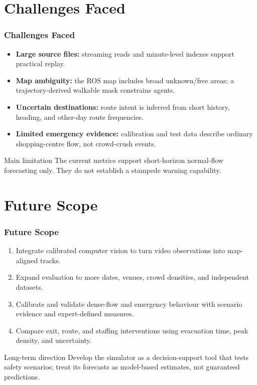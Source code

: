 \documentclass[aspectratio=43]{beamer}
\begin{document}
\section{Challenges Faced}
\begin{frame}\frametitle{Challenges Faced}
\begin{itemize}
\item \textbf{Large source files:} streaming reads and minute-level indexes support practical replay.
\item \textbf{Map ambiguity:} the ROS map includes broad unknown/free areas; a trajectory-derived walkable mask constrains agents.
\item \textbf{Uncertain destinations:} route intent is inferred from short history, heading, and other-day route frequencies.
\item \textbf{Limited emergency evidence:} calibration and test data describe ordinary shopping-centre flow, not crowd-crush events.
\end{itemize}
\begin{alertblock}{Main limitation}
The current metrics support short-horizon normal-flow forecasting only. They do not establish a stampede warning capability.
\end{alertblock}
\end{frame}

\section{Future Scope}
\begin{frame}\frametitle{Future Scope}
\begin{enumerate}
\item Integrate calibrated computer vision to turn video observations into map-aligned tracks.
\item Expand evaluation to more dates, venues, crowd densities, and independent datasets.
\item Calibrate and validate dense-flow and emergency behaviour with scenario evidence and expert-defined measures.
\item Compare exit, route, and staffing interventions using evacuation time, peak density, and uncertainty.
\end{enumerate}
\begin{block}{Long-term direction}
Develop the simulator as a decision-support tool that tests safety scenarios; treat its forecasts as model-based estimates, not guaranteed predictions.
\end{block}
\end{frame}
\end{document}
